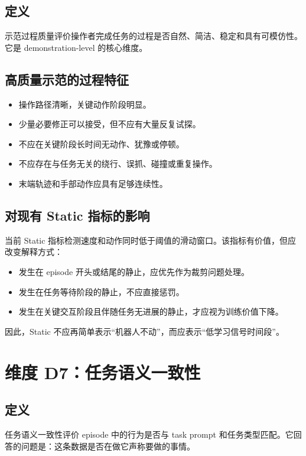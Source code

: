 \documentclass[UTF8,zihao=-4,oneside,openany]{ctexrep}
\begin{document}
\subsection{定义}

示范过程质量评价操作者完成任务的过程是否自然、简洁、稳定和具有可模仿性。它是 demonstration-level 的核心维度。

\subsection{高质量示范的过程特征}

\begin{itemize}
  \item 操作路径清晰，关键动作阶段明显。
  \item 少量必要修正可以接受，但不应有大量反复试探。
  \item 不应在关键阶段长时间无动作、犹豫或停顿。
  \item 不应存在与任务无关的绕行、误抓、碰撞或重复操作。
  \item 末端轨迹和手部动作应具有足够连续性。
\end{itemize}

\subsection{对现有 Static 指标的影响}

当前 Static 指标检测速度和动作同时低于阈值的滑动窗口。该指标有价值，但应改变解释方式：

\begin{itemize}
  \item 发生在 episode 开头或结尾的静止，应优先作为裁剪问题处理。
  \item 发生在任务等待阶段的静止，不应直接惩罚。
  \item 发生在关键交互阶段且伴随任务无进展的静止，才应视为训练价值下降。
\end{itemize}

因此，Static 不应再简单表示“机器人不动”，而应表示“低学习信号时间段”。

\section{维度 D7：任务语义一致性}

\subsection{定义}

任务语义一致性评价 episode 中的行为是否与 task prompt 和任务类型匹配。它回答的问题是：这条数据是否在做它声称要做的事情。
\end{document}
